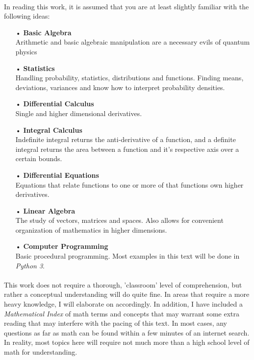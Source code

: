 \documentclass[12pt,letterpaper]{book}
\begin{document}
\paragraph*{}In reading this work, it is assumed that you are at least slightly familiar with the following ideas:
\begin{enumerate}
\item[•]\textbf{Basic Algebra}\\
Arithmetic and basic algebraic manipulation are a necessary evils of quantum physics
\item[•]\textbf{Statistics}\\
Handling probability, statistics, distributions and functions. Finding means, deviations, variances and know how to interpret probability densities.
\item[•]\textbf{Differential Calculus}\\
Single and higher dimensional derivatives.
\item[•]\textbf{Integral Calculus}\\
Indefinite integral returns the anti-derivative of a function, and a definite integral returns the area between a function and it's respective axis over a certain bounds.
\item[•]\textbf{Differential Equations}\\
Equations that relate functions to one or more of that functions own higher derivatives.
\item[•]\textbf{Linear Algebra}\\
The study of vectors, matrices and spaces. Also allows for convenient organization of mathematics in higher dimensions.
\item[•]\textbf{Computer Programming}\\
Basic procedural programming. Most examples in this text will be done in \textit{Python 3}.
\end{enumerate}
\paragraph*{}This work does not require a thorough, 'classroom' level of comprehension, but rather a conceptual understanding will do quite fine. In areas that require a more heavy knowledge, I will elaborate on accordingly. In addition, I have included a \textit{Mathematical Index} of math terms and concepts that may warrant some extra reading that may interfere with the pacing of this text. In most cases, any questions as far as math can be found within a few minutes of an internet search. In reality, most topics here will require not much more than a high school level of math for understanding. 
\end{document}
